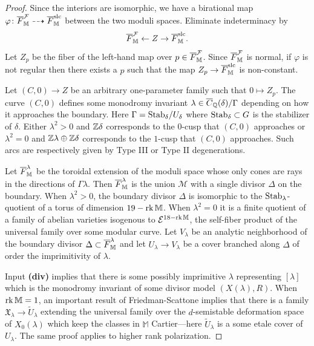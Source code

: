 \documentclass[table,x11names]{amsart}
\begin{document}
\begin{proof} Since the interiors are isomorphic, we have a birational
  map
  $\varphi\colon {\overline F}_{\mathbb M}^{{\mathcal F}} \dashrightarrow
  {\overline F}_{\mathbb M}^{{\rm slc}}$ between the two moduli
  spaces. Eliminate indeterminacy by
$${\overline F}_{\mathbb M}^{{\mathcal F}}\leftarrow Z\to {\overline F}_{\mathbb M}^{{\rm slc}}.$$
Let $Z_p$ be the fiber of the left-hand map over
$p\in {\overline F}_{\mathbb M}^{{\mathcal F}}$. Since ${\overline F}_{\mathbb M}^{\mathcal F}$ is normal, if
$\varphi$ is not regular then there exists a $p$ such that the map
$Z_p\to {\overline F}_{\mathbb M}^{\rm slc}$ is non-constant.

Let $(C,0)\to Z$ be an
arbitrary one-parameter family such that $0\mapsto Z_p$.
The curve $(C,0)$ defines some monodromy invariant $\lambda\in {\overline C}_{\mathbb{Q}}(\delta)/\Gamma$
depending on how it approaches the boundary. Here $\Gamma = {\rm Stab_\delta}/U_\delta$ where
${\rm Stab}_\delta\subset G$ is the stabilizer
of $\delta$. Either $\lambda^2>0$ and $\mathbb{Z}\delta$ corresponds
to the $0$-cusp that $(C,0)$ approaches or $\lambda^2=0$ and $\mathbb{Z}\lambda\oplus \mathbb{Z}\delta$ 
corresponds to the $1$-cusp that $(C,0)$ approaches. Such arcs are respectively
given by Type III or Type II
degenerations. 

Let ${\overline F}_{\mathbb M}^{\lambda}$ be the toroidal extension of the moduli space
whose only cones are rays in the directions of $\Gamma\lambda$. Then
${\overline F}_{\mathbb M}^{\lambda}$ is the union $\mathcal{M}$ with a single divisor $\Delta$
on the boundary. When $\lambda^2>0$, the boundary divisor $\Delta$ is
isomorphic to the ${\rm Stab}_\lambda$-quotient
of a torus of dimension $19-\operatorname{rk}\mathbb{M}$. When $\lambda^2=0$
it is a finite quotient of a family of abelian varieties
isogenous to $\mathcal{E}^{18-\operatorname{rk}{\mathbb M}}$, the self-fiber product of the universal
family over some modular curve. Let $V_\lambda$ be an analytic neighborhood
of the boundary divisor  $\Delta\subset {\overline F}_{\mathbb M}^{\lambda}$ and
let $U_\lambda\to V_\lambda$
be a cover branched along $\Delta$ of order the imprimitivity of $\lambda$.

Input {\bf (div)} implies that there is some possibly imprimitive 
$\lambda$ representing $[\lambda]$ which is the monodromy invariant of some
divisor model $(X(\lambda),R)$. When $\operatorname{rk} \mathbb{M}=1$, an important result of
Friedman-Scattone \cite[5.5, 5.6]{friedman1986type-III}
implies that there is a family $\mathfrak{X}_\lambda\to \widetilde{U}_\lambda$
extending the universal family over the $d$-semistable deformation space of
$X_0(\lambda)$ which keep the classes in $\mathbb{M}$
Cartier---here $\widetilde{U}_\lambda$ is a some etale cover 
of $U_\lambda$. The same proof
applies to higher rank polarization.
 

\end{proof}
\end{document}
